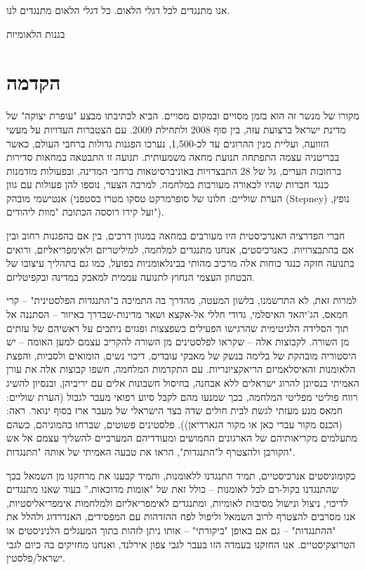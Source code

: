 אנו מתנגדים לכל דגלי הלאום.
כל דגלי הלאום מתנגדים לנו.

בגנות הלאומיות

\section{הקדמה}

מקורו של מנשר זה הוא בזמן מסויים ובמקום מסויים. הביא לכתיבתו מבצע "עופרת יצוקה" של מדינת ישראל ברצועת עזה, בין סוף 2008 ולתחילת 2009. עם הצטברות העדויות על מעשי הזוועה, ועליית מנין ההרוגים עד לכ-1,500, נערכו הפגנות גדולות ברחבי העולם, כאשר בבריטניה עצמה התפתחה תנועת מחאה משמעותית. תנועה זו התבטאה במחאות סדירות ברחובות הערים, גל של 28 התבצרויות באוניברסיטאות ברחבי המדינה, ובפעולות מזדמנות כנגד חברות שהיו לכאורה מעורבות במלחמה. למרבה הצער, נוספו להן פעולות עם גוון אנטישמי מובהק (הערת שוליים: חלונו של סופרמרקט טסקו מטרו בסטפני (Stepney) נופץ, ועל קירו רוססה הכתובת "מוות ליהודים").

חברי הפדרציה האנרכיסטית היו מעורבים במחאה במגוון דרכים, בין אם בהפגנות רחוב ובין אם בהתבצרויות. כאנרכיסטים, אנחנו מתנגדים למלחמה, למיליטריזם ולאימפריאליזם, ורואים בתנועה חזקה כנגד כוחות אלה מרכיב מהותי בבינלאומניות בפועל, כמו גם בתהליך עיצובו של הבטחון העצמי הנחוץ לתנועה עממית למאבק במדינה ובקפיטליזם.

למרות זאת, לא התרשמנו, בלשון המעטה, מהדרך בה התמיכה ב"התנגדות הפלסטינית" – קרי חמאס, הג'יהאד האיסלמי, גדודי חללי אל-אקצא ושאר מדינות-שבדרך באיזור – הסתננה אל תוך הסלידה הלגיטימית שהרגישו הפעילים כשפצצות ופגזים ניתכים על ראשיהם של עזתים מן השורה. לקבוצות אלה – שקראו לפלסטינים מן השורה להקריב עצמם למען האומה – יש היסטוריה מובהקת של בלימה בנשק של מאבקי עובדים, דיכוי נשים, הומואים ולסביות, והפצת הלאומנות והאיסלאמיזם הריאקציונריות. עם התקדמות המלחמה, חשפו קבוצות אלה את עורן האמיתי בנסיונן להרוג ישראלים ללא אבחנה, בחיסול חשבונות אלים עם יריביהן, ובנסיון להשיג רווח פוליטי מפליטי המלחמה, בכך שמנעו מהם לקבל סיוע רפואי מעבר לגבול (הערת שוליים: חמאס מנע מעזתי לגשת לבית חולים שדה בצד הישראלי של מעבר ארז בסוף ינואר. ראה: (הכנס מקור עברי כאן או מקור הגארדיאן)). פלסטינים פשוטים, שברחו בהמוניהם, כשהם מתעלמים מקריאותיהם של הארגונים החמושים ומעודדיהם המערביים להשליך עצמם אל אש הקורבן ולהצטרף ל"התנגדות", הראו את טבעה האמיתי של אותה "התנגדות".

כקומוניסטים אנרכיסטיים, תמיד התנגדנו ללאומנות, ותמיד קבענו את מרחקנו מן השמאל בכך שהתנגדנו בקול-רם לכל לאומנות – כולל זאת של "אומות מדוכאות.” בעוד שאנו מתנגדים לדיכוי, ניצול ונישול מסיבות לאומיות, ומתנגדים לאימפריאליזם ולמלחמות אימפריאליסטיות, אנו מסרבים להצטרף לרוב השמאל וליפול לפח ההזדהות עם המפסידים, האנדרדוג ולהלל את "ההתנגדות" – גם אם באופן "ביקורתי" – אותו ניתן לזהות בתוך המעגלים הלניניסטים או הטרוצקיסטיים. אנו החזקנו בעמדה הזו בעבר לגבי צפון אירלנד, ואנחנו מחזיקים בה כיום לגבי ישראל/פלסטין.

